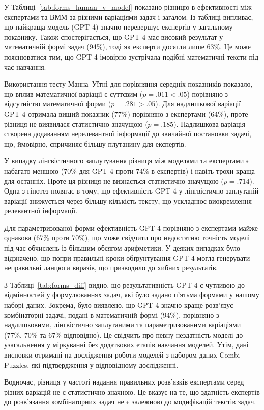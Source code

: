 У Таблиці~\ref{tab:forms_human_v_model} показано різницю в ефективності між експертами та ВММ за різними варіаціями задач і загалом. Із таблиці випливає, що найкраща модель (GPT-4) значно перевершує експертів у загальному показнику. Також спостерігається, що GPT-4 має високий результат у математичній формі задач (94\%), тоді як експерти досягли лише 63\%. Це може пояснюватися тим, що GPT-4 імовірно зустрічала подібні математичні тексти під час навчання.

Використання тесту Манна–Уїтні для порівняння середніх показників показало, що вплив математичної варіації є суттєвим ($p = .011 < .05$) порівняно з відсутністю математичної форми ($p = .281 > .05$). Для надлишкової варіації GPT-4 отримала вищий показник (77\%) порівняно з експертами (64\%), проте різниця не виявилася статистично значущою ($p=.185$). Надлишкова варіація створена додаванням нерелевантної інформації до звичайної постановки задачі, що, ймовірно, спричиняє більшу плутанину для експертів.

У випадку лінгвістичного заплутування різниця між моделями та експертами є набагато меншою (70\% для GPT-4 проти 74\% в експертів) і навіть трохи краща для останніх. Проте ця різниця не визнається статистично значущою ($p=.714$). Одна з гіпотез полягає в тому, що ефективність GPT-4 у лінгвістично заплутаній варіації знижується через більшу кількість тексту, що ускладнює виокремлення релевантної інформації.

Для параметризованої форми ефективність GPT-4 порівняно з експертами майже однакова (67\% проти 70\%), що може свідчити про недостатню точність моделі під час обчислень із більшим обсягом арифметики. У деяких випадках було відзначено, що попри правильні кроки обґрунтування GPT-4 могла генерувати неправильні ланцюги виразів, що призводило до хибних результатів.

З Таблиці~\ref{tab:forms_diff} видно, що результативність GPT-4 є чутливою до відмінностей у формулюваннях задач, які було задано п’ятьма формами у нашому наборі даних. Зокрема, було виявлено, що GPT-4 значно краще розв’язує комбінаторні задачі, подані в математичній формі (94\%), порівняно з надлишковими, лінгвістично заплутаними та параметризованими варіаціями (77\%, 70\% та 67\% відповідно). Це свідчить про певну нездатність моделі до узагальнення у міркуванні без додаткових етапів навчання моделей. Утім, дані висновки отримані на дослідження роботи моделей з набором даних Combi-Puzzles, які підтвердження у відповідному дослідженні.

Водночас, різниця у частоті надання правильних розв'язків експертами серед різних варіацій не є статистично значною. Це вказує на те, що здатність експертів до розв’язання комбінаторних задач не є залежною до модифікацій текстів задач.

